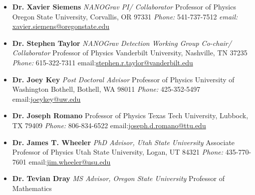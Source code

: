 \documentclass[11pt,letterpaper,sans,unicode]{moderncv}
\newcommand{\blucirc}{{\color{color1} $\circ\;\;$}}
\begin{document}
	\renewcommand\labelitemi{\blucirc}
	\begin{itemize}[leftmargin=8mm]
	\setlength\itemsep{0.05mm}
	\item \textbf{Dr. Xavier Siemens} \emph{NANOGrav PI/ Collaborator}
        		\newline Professor of Physics
		\newline Oregon State University, Corvallis, OR 97331
		\newline \emph{Phone:} 541-737-7512 \qquad \emph{email:} \url{xavier.siemens@oregonstate.edu}
		\newline
	\item \textbf{Dr. Stephen Taylor} \emph{NANOGrav Detection Working Group Co-chair/ Collaborator}
       		\newline Professor of Physics
		\newline Vanderbilt University, Nashville, TN 37235
		\newline \emph{Phone:} 615-322-7311 \qquad email:\url{stephen.r.taylor@vanderbilt.edu}
		\newline
	\item \textbf{Dr. Joey Key} \emph{Post Doctoral Advisor}
       		\newline Professor of Physics
		\newline University of Washington Bothell, Bothell, WA 98011
		\newline \emph{Phone:} 425-352-5497 \qquad email:\url{joeykey@uw.edu}
		\newline
	\item \textbf{Dr. Joseph Romano} %
       		\newline Professor of Physics
		\newline Texas Tech University, Lubbock, TX 79409
		\newline \emph{Phone:} 806-834-6522 \qquad email:\url{joseph.d.romano@ttu.edu}
		\newline
	\item \textbf{Dr. James T. Wheeler} \emph{PhD Advisor, Utah State University}
        		\newline Associate Professor of Physics
		\newline Utah State University, Logan, UT 84321
		\newline \emph{Phone:} 435-770-7601 \qquad email:\url{jim.wheeler@usu.edu}
		\newline
	\item \textbf{Dr. Tevian Dray} \emph{MS Advisor, Oregon State University}
     		\newline Professor of Mathematics

\end{itemize}
\end{document}
